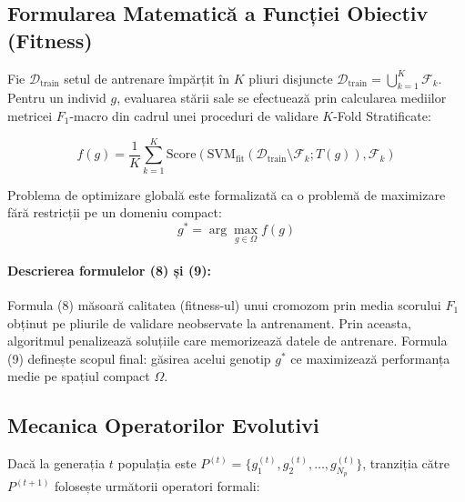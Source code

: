 \documentclass[12pt,a4paper]{report}
\begin{document}
\subsection{Formularea Matematică a Funcției Obiectiv (Fitness)}
Fie $\mathcal{D}_{\text{train}}$ setul de antrenare împărțit în $K$ pliuri disjuncte $\mathcal{D}_{\text{train}} = \bigcup_{k=1}^K \mathcal{F}_k$. Pentru un individ $g$, evaluarea stării sale se efectuează prin calcularea mediilor metricei $F_1$-macro din cadrul unei proceduri de validare $K$-Fold Stratificate:

\begin{equation}
f(g) = \frac{1}{K} \sum_{k=1}^{K} \text{Score}\left( \text{SVM}_{\text{fit}}\left(\mathcal{D}_{\text{train}} \setminus \mathcal{F}_k; T(g)\right), \mathcal{F}_k \right)
\end{equation}

Problema de optimizare globală este formalizată ca o problemă de maximizare fără restricții pe un domeniu compact:
\begin{equation}
g^* = \arg\max_{g \in \Omega} f(g)
\end{equation}

\paragraph{Descrierea formulelor (8) și (9):}
Formula (8) măsoară calitatea (fitness-ul) unui cromozom prin media scorului $F_1$ obținut pe pliurile de validare neobservate la antrenament. Prin aceasta, algoritmul penalizează soluțiile care memorizează datele de antrenare. Formula (9) definește scopul final: găsirea acelui genotip $g^*$ ce maximizează performanța medie pe spațiul compact $\Omega$.

\subsection{Mecanica Operatorilor Evolutivi}
Dacă la generația $t$ populația este $P^{(t)} = \{g_1^{(t)}, g_2^{(t)}, \dots, g_{N_p}^{(t)}\}$, tranziția către $P^{(t+1)}$ folosește următorii operatori formali:
\end{document}
